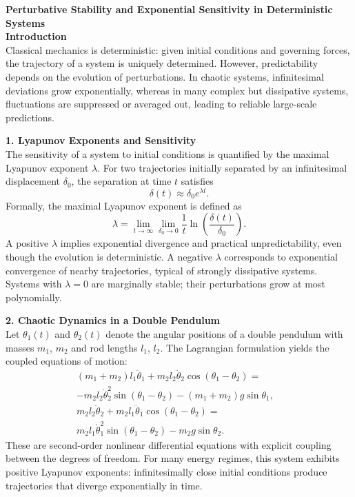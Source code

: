 \begin{technical}
{\Large\textbf{Perturbative Stability and Exponential Sensitivity in Deterministic Systems}}\\[0.7em]

\textbf{Introduction}\\[0.5em]
Classical mechanics is deterministic: given initial conditions and governing forces, the trajectory of a system is uniquely determined. However, predictability depends on the evolution of perturbations. In chaotic systems, infinitesimal deviations grow exponentially, whereas in many complex but dissipative systems, fluctuations are suppressed or averaged out, leading to reliable large-scale predictions.

\textbf{1. Lyapunov Exponents and Sensitivity}\\[0.5em]
The sensitivity of a system to initial conditions is quantified by the maximal Lyapunov exponent $\lambda$. For two trajectories initially separated by an infinitesimal displacement $\delta_0$, the separation at time $t$ satisfies
\[
\delta(t) \approx \delta_0 e^{\lambda t}.
\]
Formally, the maximal Lyapunov exponent is defined as
\[
\lambda = \lim_{t \to \infty} \lim_{\delta_0 \to 0} \frac{1}{t} \ln \left( \frac{\delta(t)}{\delta_0} \right).
\]
A positive $\lambda$ implies exponential divergence and practical unpredictability, even though the evolution is deterministic. A negative $\lambda$ corresponds to exponential convergence of nearby trajectories, typical of strongly dissipative systems. Systems with $\lambda = 0$ are marginally stable; their perturbations grow at most polynomially.

\textbf{2. Chaotic Dynamics in a Double Pendulum}\\[0.5em]
Let $\theta_1(t)$ and $\theta_2(t)$ denote the angular positions of a double pendulum with masses $m_1$, $m_2$ and rod lengths $l_1$, $l_2$. The Lagrangian formulation yields the coupled equations of motion:
\begin{align*}
(m_1 + m_2) l_1 \ddot{\theta}_1 
+ m_2 l_2 \ddot{\theta}_2 \cos(\theta_1 - \theta_2) 
=&\\ -m_2 l_2 \dot{\theta}_2^2 \sin(\theta_1 - \theta_2) 
- (m_1 + m_2) g \sin\theta_1, \\[0.5em]
m_2 l_2 \ddot{\theta}_2 
+ m_2 l_1 \ddot{\theta}_1 \cos(\theta_1 - \theta_2) 
=&\\ m_2 l_1 \dot{\theta}_1^2 \sin(\theta_1 - \theta_2) 
- m_2 g \sin\theta_2.
\end{align*}
These are second-order nonlinear differential equations with explicit coupling between the degrees of freedom. For many energy regimes, this system exhibits positive Lyapunov exponents: infinitesimally close initial conditions produce trajectories that diverge exponentially in time.


\end{technical}
